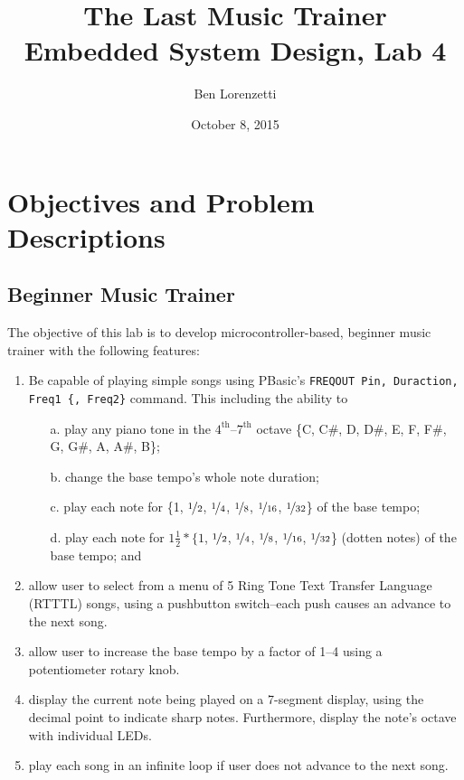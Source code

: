 \documentclass[11pt]{article}
\begin{document}
\title{The Last Music Trainer\\Embedded System Design, Lab 4}
\date{October 8, 2015}
\author{Ben Lorenzetti}
\maketitle

\tableofcontents

\clearpage

\section{Objectives and Problem Descriptions}
\subsection{Beginner Music Trainer}
\label{problem-specs}

The objective of this lab is to develop microcontroller-based, beginner music trainer 
with the following features:
\begin{enumerate}

\item Be capable of playing simple songs using PBasic's 
\mbox{\texttt{FREQOUT Pin, Duraction, Freq1 \{, Freq2\}}} command.
This including the ability to
\begin{enumerate}
\item[a.] play any piano tone in the $4^{\textrm{th}}$--$7^{\textrm{th}}$ octave
\{C, C\#, D, D\#, E, F, F\#, G, G\#, A, A\#, B\};

\item[b.] change the base tempo's whole note duration;

\item[c.] play each note for \{1, $\nicefrac{1}{2}$, $\nicefrac{1}{4}$, $\nicefrac{1}{8}$,
$\nicefrac{1}{16}$, $\nicefrac{1}{32}$\} of the base tempo;

\item[d.] play each note for $1\frac{1}{2}*\{1$, $\nicefrac{1}{2}$, $\nicefrac{1}{4}$, $\nicefrac{1}{8}$, 
$\nicefrac{1}{16}$, $\nicefrac{1}{32}$\} (dotten notes) of the base tempo; and
\end{enumerate}

\item allow user to select from a menu of 5 Ring Tone Text Transfer Language
(RTTTL) songs,
using a pushbutton switch--each push causes an advance to the next song.

\item allow user to increase the base tempo by a factor of 1--4 using a potentiometer rotary knob.

\item display the current note being played on a 7-segment display,
using the decimal point to indicate sharp notes.
Furthermore, display the note's octave with individual LEDs.

\item play each song in an infinite loop if user does not advance to the next song.
\end{enumerate}
\end{document}

